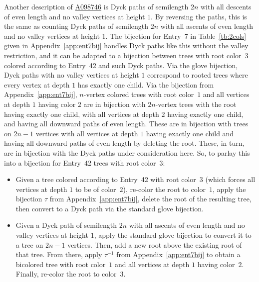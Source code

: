 \documentclass[12pt]{amsart}
\newcommand{\seqnum}[1]{\href{https://oeis.org/#1}{#1}}
\begin{document}
\begin{description}
Another description of \seqnum{A098746} is Dyck paths of semilength $2n$ with all descents of even length and no valley vertices at height $1$. By reversing the paths, this is the same as counting Dyck paths of semilength $2n$ with all ascents of even length and no valley vertices at height $1$. The bijection for Entry~7 in Table~\ref{tb:2cols} given in Appendix~\ref{app:ent7bij} handles Dyck paths like this without the valley restriction, and it can be adapted to a bijection between trees with root color~$3$ colored according to Entry~42 and such Dyck paths. Via the glove bijection, Dyck paths with no valley vertices at height $1$ correspond to rooted trees where every vertex at depth $1$ has exactly one child. Via the bijection from Appendix~\ref{app:ent7bij}, $n$-vertex colored trees with root color~$1$ and all vertices at depth $1$ having color $2$ are in bijection with $2n$-vertex trees with the root having exactly one child, with all vertices at depth $2$ having exactly one child, and having all downward paths of even length. These are in bijection with trees on $2n-1$ vertices with all vertices at depth $1$ having exactly one child and having all downward paths of even length by deleting the root. These, in turn, are in bijection with the Dyck paths under consideration here. So, to parlay this into a bijection for Entry~42 trees with root color~$3$:
\begin{itemize}
    \item Given a tree colored according to Entry~42 with root color~$3$ (which forces all vertices at depth $1$ to be of color~$2$), re-color the root to color~$1$, apply the bijection $\tau$ from Appendix~\ref{app:ent7bij}, delete the root of the resulting tree, then convert to a Dyck path via the standard glove bijection.
    \item Given a Dyck path of semilength $2n$ with all ascents of even length and no valley vertices at height $1$, apply the standard glove bijection to convert it to a tree on $2n-1$ vertices. Then, add a new root above the existing root of that tree. From there, apply $\tau^{-1}$ from Appendix~\ref{app:ent7bij} to obtain a bicolored tree with root color~$1$ and all vertices at depth $1$ having color~$2$. Finally, re-color the root to color~$3$.
\end{itemize}
\end{description}
\end{document}
